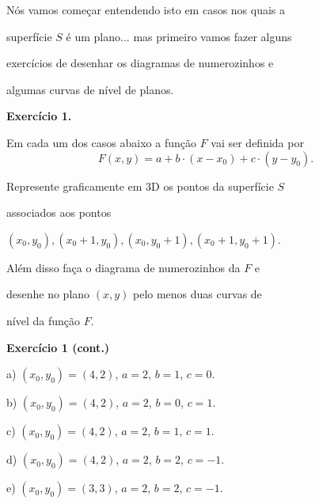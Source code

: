 \documentclass[oneside,12pt]{article}
\begin{document}
\newpage

Nós vamos começar entendendo isto em casos nos quais a

superfície $S$ é um plano... mas primeiro vamos fazer alguns

exercícios de desenhar os diagramas de numerozinhos e

algumas curvas de nível de planos.


\msk

{\bf Exercício 1.}

Em cada um dos casos abaixo a função $F$ vai ser definida por
%
$$F(x,y) = a + b·(x-x_0) + c·(y-y_0).$$

Represente graficamente em 3D os pontos da superfície $S$

associados aos pontos

$(x_0,y_0), (x_0+1,y_0), (x_0,y_0+1), (x_0+1,y_0+1)$.

Além disso faça o diagrama de numerozinhos da $F$ e

desenhe no plano $(x,y)$ pelo menos duas curvas de

nível da função $F$.


\newpage

{\bf Exercício 1 (cont.)}

a) $(x_0,y_0) = (4,2)$, $a=2$, $b=1$, $c=0$.

b) $(x_0,y_0) = (4,2)$, $a=2$, $b=0$, $c=1$.

c) $(x_0,y_0) = (4,2)$, $a=2$, $b=1$, $c=1$.

d) $(x_0,y_0) = (4,2)$, $a=2$, $b=2$, $c=-1$.

e) $(x_0,y_0) = (3,3)$, $a=2$, $b=2$, $c=-1$.








\end{document}
